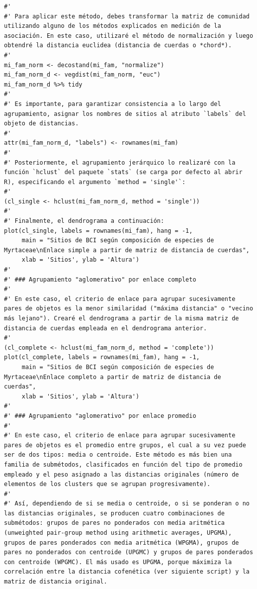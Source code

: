 \documentclass[11pt,]{article}
\begin{document}
\begin{verbatim}
#' 
#' Para aplicar este método, debes transformar la matriz de comunidad utilizando alguno de los métodos explicados en medición de la asociación. En este caso, utilizaré el método de normalización y luego obtendré la distancia euclidea (distancia de cuerdas o *chord*).
#' 
mi_fam_norm <- decostand(mi_fam, "normalize")
mi_fam_norm_d <- vegdist(mi_fam_norm, "euc")
mi_fam_norm_d %>% tidy
#'
#' Es importante, para garantizar consistencia a lo largo del agrupamiento, asignar los nombres de sitios al atributo `labels` del objeto de distancias.
#' 
attr(mi_fam_norm_d, "labels") <- rownames(mi_fam)
#' 
#' Posteriormente, el agrupamiento jerárquico lo realizaré con la función `hclust` del paquete `stats` (se carga por defecto al abrir R), especificando el argumento `method = 'single'`:
#' 
(cl_single <- hclust(mi_fam_norm_d, method = 'single'))
#' 
#' Finalmente, el dendrograma a continuación:
plot(cl_single, labels = rownames(mi_fam), hang = -1,
     main = "Sitios de BCI según composición de especies de Myrtaceae\nEnlace simple a partir de matriz de distancia de cuerdas",
     xlab = 'Sitios', ylab = 'Altura')
#' 
#' ### Agrupamiento "aglomerativo" por enlace completo
#' 
#' En este caso, el criterio de enlace para agrupar sucesivamente pares de objetos es la menor similaridad ("máxima distancia" o "vecino más lejano"). Crearé el dendrograma a partir de la misma matriz de distancia de cuerdas empleada en el dendrograma anterior.
#' 
(cl_complete <- hclust(mi_fam_norm_d, method = 'complete'))
plot(cl_complete, labels = rownames(mi_fam), hang = -1,
     main = "Sitios de BCI según composición de especies de Myrtaceae\nEnlace completo a partir de matriz de distancia de cuerdas",
     xlab = 'Sitios', ylab = 'Altura')
#' 
#' ### Agrupamiento "aglomerativo" por enlace promedio
#' 
#' En este caso, el criterio de enlace para agrupar sucesivamente pares de objetos es el promedio entre grupos, el cual a su vez puede ser de dos tipos: media o centroide. Este método es más bien una familia de submétodos, clasificados en función del tipo de promedio empleado y el peso asignado a las distancias originales (número de elementos de los clusters que se agrupan progresivamente).
#' 
#' Así, dependiendo de si se media o centroide, o si se ponderan o no las distancias originales, se producen cuatro combinaciones de submétodos: grupos de pares no ponderados con media aritmética (unweighted pair-group method using arithmetic averages, UPGMA), grupos de pares ponderados con media aritmética (WPGMA), grupos de pares no ponderados con centroide (UPGMC) y grupos de pares ponderados con centroide (WPGMC). El más usado es UPGMA, porque máximiza la correlación entre la distancia cofenética (ver siguiente script) y la matriz de distancia original.

\end{verbatim}
\end{document}
